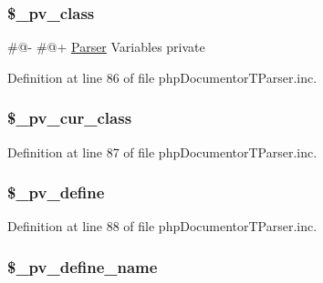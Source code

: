 \hypertarget{classphp_documentor_t_parser_aca946c4e206f7368d3ab6ec90417c088}{
\subsubsection[{\$\-\_\-pv\-\_\-class}]{\setlength{\rightskip}{0pt plus 5cm}\$\-\_\-pv\-\_\-class}}\label{classphp_documentor_t_parser_aca946c4e206f7368d3ab6ec90417c088}
\#@-\/ \#@+ \hyperlink{class_parser}{\-Parser} \-Variables  private 

\-Definition at line 86 of file php\-Documentor\-T\-Parser.\-inc.

\hypertarget{classphp_documentor_t_parser_a156cbb652fd0e1d944579d772c0ab12f}{
\subsubsection[{\$\-\_\-pv\-\_\-cur\-\_\-class}]{\setlength{\rightskip}{0pt plus 5cm}\$\-\_\-pv\-\_\-cur\-\_\-class}}\label{classphp_documentor_t_parser_a156cbb652fd0e1d944579d772c0ab12f}


\-Definition at line 87 of file php\-Documentor\-T\-Parser.\-inc.

\hypertarget{classphp_documentor_t_parser_a2244a03f56f359e9af735e77f1ba3506}{
\subsubsection[{\$\-\_\-pv\-\_\-define}]{\setlength{\rightskip}{0pt plus 5cm}\$\-\_\-pv\-\_\-define}}\label{classphp_documentor_t_parser_a2244a03f56f359e9af735e77f1ba3506}


\-Definition at line 88 of file php\-Documentor\-T\-Parser.\-inc.

\hypertarget{classphp_documentor_t_parser_a75695f40aeff05ab37b892bfdee6f73f}{
\subsubsection[{\$\-\_\-pv\-\_\-define\-\_\-name}]{\setlength{\rightskip}{0pt plus 5cm}\$\-\_\-pv\-\_\-define\-\_\-name}}\label{classphp_documentor_t_parser_a75695f40aeff05ab37b892bfdee6f73f}


